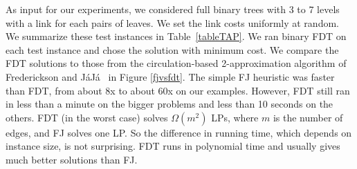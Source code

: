 As input for our experiments, we considered full binary trees with 3 to 7 levels with a link for each pairs of leaves. We set the link costs uniformly at random.  We summarize these test instances in Table~\ref{tableTAP}. We ran binary FDT on each test instance and chose the solution with minimum cost. We compare the FDT solutions to those from the circulation-based 2-approximation algorithm of Frederickson and J\'{a}J\'{a}~\cite{FJ81} in Figure \ref{fjvsfdt}.  The simple FJ heuristic was faster than FDT, from about 8x to about 60x on our examples. However, FDT still ran in less than a minute on the bigger problems and less than 10 seconds on the others. FDT (in the worst case) solves $\Omega(m^2)$ LPs, where $m$ is the number of edges, and FJ solves one LP. So the difference in running time, which depends on instance size, is not surprising. FDT runs in polynomial time and usually gives much better solutions than FJ. 



